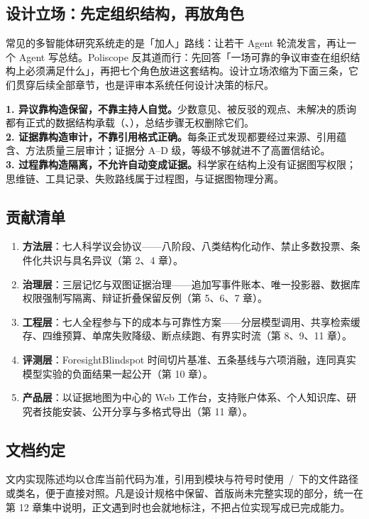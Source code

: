 \subsection{设计立场：先定组织结构，再放角色}

常见的多智能体研究系统走的是「加人」路线：让若干 Agent 轮流发言，再让一个 Agent 写总结。Poliscope 反其道而行：先回答「一场可靠的争议审查在组织结构上必须满足什么」，再把七个角色放进这套结构。设计立场浓缩为下面三条，它们贯穿后续全部章节，也是评审本系统任何设计决策的标尺。

\begin{principlebox}
\textbf{1. 异议靠构造保留，不靠主持人自觉。}少数意见、被反驳的观点、未解决的质询都有正式的数据结构承载（、），总结步骤无权删除它们。\\[3pt]
\textbf{2. 证据靠构造审计，不靠引用格式正确。}每条正式发现都要经过来源、引用蕴含、方法质量三层审计；证据分 A–D 级，等级不够就进不了高置信结论。\\[3pt]
\textbf{3. 过程靠构造隔离，不允许自动变成证据。}科学家在结构上没有证据图写权限；思维链、工具记录、失败路线属于过程图，与证据图物理分离。
\end{principlebox}

\subsection{贡献清单}

\begin{enumerate}[leftmargin=1.6em, itemsep=4pt]
\item \textbf{方法层}：七人科学议会协议——八阶段、八类结构化动作、禁止多数投票、条件化共识与具名异议（第 2、4 章）。
\item \textbf{治理层}：三层记忆与双图证据治理——追加写事件账本、唯一投影器、数据库权限强制写隔离、辩证折叠保留反例（第 5、6、7 章）。
\item \textbf{工程层}：七人全程参与下的成本与可靠性方案——分层模型调用、共享检索缓存、四维预算、单席失败降级、断点续跑、有界实时流（第 8、9、11 章）。
\item \textbf{评测层}：ForesightBlindspot 时间切片基准、五条基线与六项消融，连同真实模型实验的负面结果一起公开（第 10 章）。
\item \textbf{产品层}：以证据地图为中心的 Web 工作台，支持账户体系、个人知识库、研究者技能安装、公开分享与多格式导出（第 11 章）。
\end{enumerate}

\subsection{文档约定}

文内实现陈述均以仓库当前代码为准，引用到模块与符号时使用 \,/\, 下的文件路径或类名，便于直接对照。凡是设计规格中保留、首版尚未完整实现的部分，统一在第 12 章集中说明，正文遇到时也会就地标注，不把占位实现写成已完成能力。
